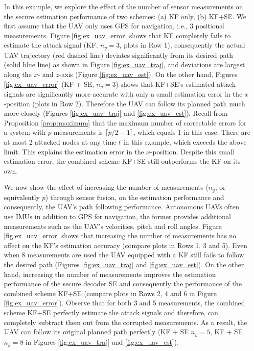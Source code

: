 \documentclass[journal]{IEEEtran}
\begin{document}
In this example, we explore the effect of the number of sensor measurements on the secure estimation performance of two schemes: (a) KF only, (b) KF+SE.
We first assume that the UAV only uses GPS for navigation, i.e., 3 positional measurements. 
Figure \ref{fig:ex_uav_error} shows that KF completely fails to estimate the attack signal (KF, $n_y = 3$, plots in Row 1), consequently the actual UAV trajectory (red dashed line)  deviates significantly from its desired path (solid blue line) as shown in Figure \ref{fig:ex_uav_traj}, and deviations are largest along the $x$- and $z$-axis (Figure \ref{fig:ex_uav_est}).
On the other hand, Figures \ref{fig:ex_uav_error} (KF + SE, $n_y = 3$) shows that KF+SE's estimated attack signals are significantly more accurate with only a small estimation error in the $x$-position (plots in Row 2). 
Therefore the UAV can follow its planned path much more closely (Figures \ref{fig:ex_uav_traj}  and \ref{fig:ex_uav_est}).
Recall from Proposition \ref{prop:maximum} that the maximum number of correctable errors for a system with $p$ measurements is $\lceil p/2-1 \rceil$, which equals 1 in this case. There are at most 2 attacked nodes at any time $t$ in this example, which exceeds the above limit. This explains the estimation error in the $x$-position. Despite this small estimation error, the combined scheme KF+SE still outperforms the KF on its own.

We now show the effect of increasing the number of measurements ($n_y$, or equivalently $p$) through sensor fusion, on the estimation performance and consequently, the UAV's path following performance. Autonomous UAVs often use IMUs in addition to GPS for navigation, the former provides additional measurements such as the UAV's velocities, pitch and roll angles. Figure \ref{fig:ex_uav_error} shows that increasing the number of measurements has no affect on the KF's estimation accuracy (compare plots in Rows 1, 3 and 5). 
Even when 8 measurements are used the UAV equipped with a KF still fails to follow the desired path (Figures \ref{fig:ex_uav_traj} and \ref{fig:ex_uav_est}). On the other hand, increasing the number of measurements improves the estimation performance of the secure decoder SE and consequently the performance of the combined scheme KF+SE (compare plots in Rows 2, 4 and 6 in Figure  \ref{fig:ex_uav_error}). Observe that for both 3 and 5 measurements, the combined scheme KF+SE perfectly estimate the attack signals and therefore, can completely subtract them out from the corrupted measurements. As a result, the UAV can follow its original planned path perfectly (KF + SE $n_y=5$, KF + SE $n_y=8$ in Figures \ref{fig:ex_uav_traj} and \ref{fig:ex_uav_est}).
\end{document}
